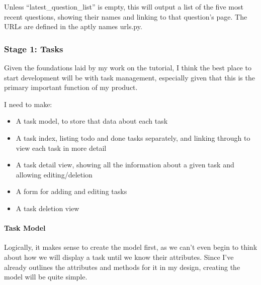 \documentclass[]{article}
\let\oldparagraph\paragraph
\renewcommand{\paragraph}[1]{\oldparagraph{#1}\mbox{}}
\begin{document}
Unless ``latest\_question\_list'' is empty, this will output a list of
the five most recent questions, showing their names and linking to that
question's page. The URLs are defined in the aptly names urls.py.

\hypertarget{stage-1-tasks}{%
\subsubsection{Stage 1: Tasks}\label{stage-1-tasks}}

Given the foundations laid by my work on the tutorial, I think the best
place to start development will be with task management, especially
given that this is the primary important function of my product.

I need to make:

\begin{itemize}
\item
  A task model, to store that data about each task
\item
  A task index, listing todo and done tasks separately, and linking
  through to view each task in more detail
\item
  A task detail view, showing all the information about a given task and
  allowing editing/deletion
\item
  A form for adding and editing tasks
\item
  A task deletion view
\end{itemize}

\hypertarget{task-model}{%
\paragraph{Task Model}\label{task-model}}

Logically, it makes sense to create the model first, as we can't even
begin to think about how we will display a task until we know their
attributes. Since I've already outlines the attributes and methods for
it in my design, creating the model will be quite simple.
\end{document}
